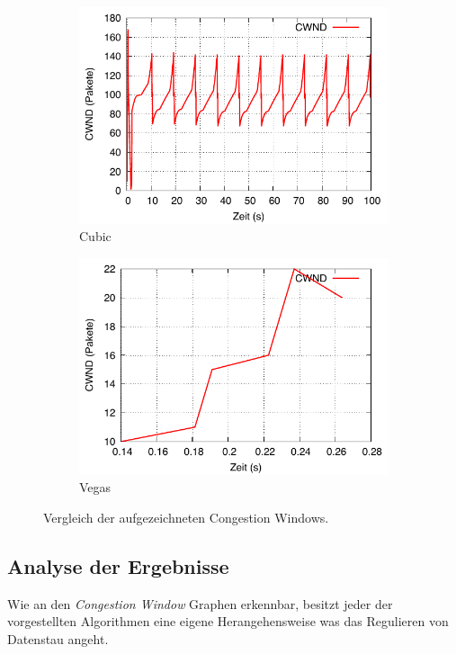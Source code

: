 \documentclass[paper=a4,fontsize=12pt,ngerman]{scrartcl}
\begin{document}
\begin{figure}[H]
\begin{subfigure}{0.40\textwidth}
        \includegraphics[width=\linewidth]{graphics/cubicCW.pdf}
        \caption{Cubic}
        \label{fig:cubic}
    \end{subfigure}
    \hfill
    \begin{subfigure}{0.40\textwidth}
        \includegraphics[width=\linewidth]{graphics/vegasCW.pdf}
        \caption{Vegas}
        \label{fig:vegas}
    \end{subfigure}

    \caption{Vergleich der aufgezeichneten Congestion Windows.}
    \label{fig:cwnd-all}
\end{figure}

\clearpage 
\subsection{Analyse der Ergebnisse}
Wie an den \textit{Congestion Window} Graphen erkennbar, besitzt jeder 
der vorgestellten Algorithmen eine eigene Herangehensweise was  das Regulieren 
von Datenstau angeht.
\end{document}
